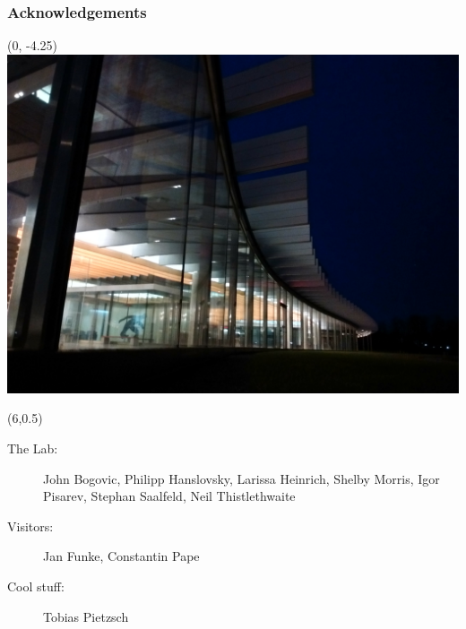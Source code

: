 \documentclass[aspectratio=169,table]{beamer}
\begin{document}
\begin{frame}
    \frametitle{Acknowledgements}
    \begin{textblock}{16}(0, -4.25) 
        \includegraphics[width=\textwidth]{fig/janelia.jpg}
    \end{textblock}%
    \begin{textblock}{9.8}(6,0.5)
        \scriptsize%
        \begin{description}
              \item[The Lab:]{\color{white}John Bogovic, Philipp Hanslovsky, Larissa Heinrich, Shelby Morris, Igor Pisarev, Stephan Saalfeld, Neil Thistlethwaite}
              \item[Visitors:]{\color{white}Jan Funke, Constantin Pape}
              \item[Cool stuff:]{\color{white}Tobias Pietzsch}
\end{description}
\end{textblock}
\end{frame}

    
\end{document}
